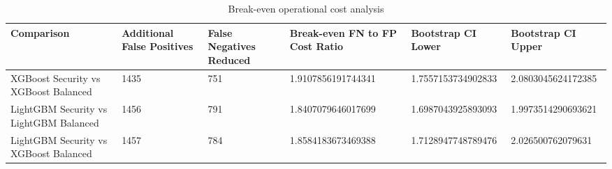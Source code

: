 \begin{table}[htbp]
\centering
\caption{Break-even operational cost analysis}
\begin{tabular}{llllll}
\hline
Comparison & Additional False Positives & False Negatives Reduced & Break-even FN to FP Cost Ratio & Bootstrap CI Lower & Bootstrap CI Upper \\
\hline
XGBoost Security vs XGBoost Balanced & 1435 & 751 & 1.9107856191744341 & 1.7557153734902833 & 2.0803045624172385 \\
LightGBM Security vs LightGBM Balanced & 1456 & 791 & 1.8407079646017699 & 1.6987043925893093 & 1.9973514290693621 \\
LightGBM Security vs XGBoost Balanced & 1457 & 784 & 1.8584183673469388 & 1.7128947748789476 & 2.026500762079631 \\
\hline
\end{tabular}
\end{table}
